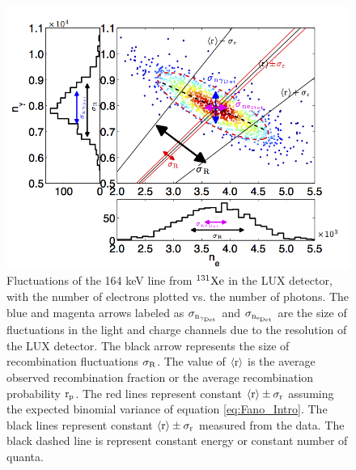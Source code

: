 \renewcommand{\baselinestretch}{1}
\small\normalsize
\begin{figure}[h!]\centering
\includegraphics[width=150mm]{Chapter_Flucs/Figures/Ex_Plots/r_fig.png}
\caption{Fluctuations of the 164 keV line from $\rm ^{131}Xe$ in the LUX detector, with the number of electrons plotted vs. the number of photons. The blue and magenta arrows labeled as $\rm \sigma_{n_{\gamma_{Det}}}$ and $\rm \sigma_{n_{e_{Det}}}$ are the size of fluctuations in the light and charge channels due to the resolution of the LUX detector. The black arrow represents the size of recombination fluctuations $\rm \sigma_R$. The value of $\rm \left<r\right>$ is the average observed recombination fraction or the average recombination probability $\rm r_p$. The red lines represent constant $\rm \left<r\right> \pm \sigma_r $ assuming the expected binomial variance of equation \ref{eq:Fano_Intro}. The black lines represent constant $\rm \left<r\right> \pm \sigma_r $ measured from the data. The black dashed line is represent constant energy or constant number of quanta.  }
\label{fig:Flucs_Ex}
\end{figure}
\renewcommand{\baselinestretch}{2}
\small\normalsize

